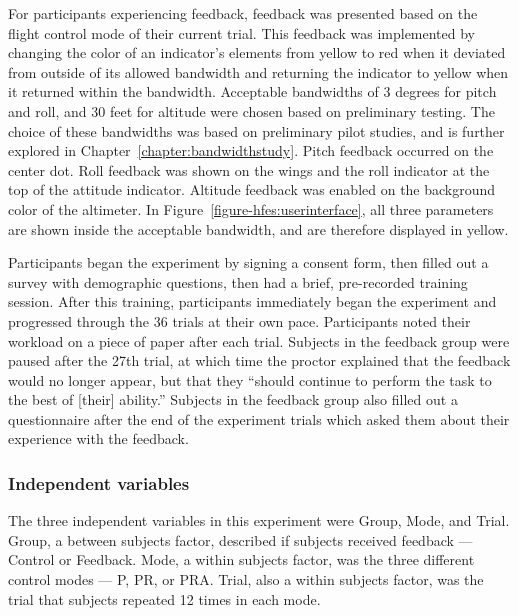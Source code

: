 For participants experiencing feedback, feedback was presented based on the flight control mode of their current trial.
This feedback was implemented by changing the color of an indicator's elements from yellow to red when it deviated from outside of its allowed bandwidth and returning the indicator to yellow when it returned within the bandwidth.
Acceptable bandwidths of 3 degrees for pitch and roll, and 30 feet for altitude were chosen based on preliminary testing.
The choice of these bandwidths was based on preliminary pilot studies, and is further explored in Chapter~\ref{chapter:bandwidthstudy}.
Pitch feedback occurred on the center dot.
Roll feedback was shown on the wings and the roll indicator at the top of the attitude indicator.
Altitude feedback was enabled on the background color of the altimeter.
In Figure~\ref{figure-hfes:userinterface}, all three parameters are shown inside the acceptable bandwidth, and are therefore displayed in yellow.

Participants began the experiment by signing a consent form, then filled out a survey with demographic questions, then had a brief, pre-recorded training session.
After this training, participants immediately began the experiment and progressed through the 36 trials at their own pace.
Participants noted their workload on a piece of paper after each trial.
Subjects in the feedback group were paused after the 27th trial, at which time the proctor explained that the feedback would no longer appear, but that they ``should continue to perform the task to the best of [their] ability.'' Subjects in the feedback group also filled out a questionnaire after the end of the experiment trials which asked them about their experience with the feedback.

\subsubsection{Independent variables}
The three independent variables in this experiment were Group, Mode, and Trial.
Group, a between subjects factor, described if subjects received feedback --- Control or Feedback.
Mode, a within subjects factor, was the three different control modes --- P, PR, or PRA.
Trial, also a within subjects factor, was the trial that subjects repeated 12 times in each mode.

